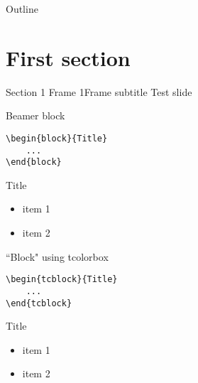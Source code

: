 {
    \addtocounter{framenumber}{-2}    %
    
    \begin{frame}
        \titlepage
    \end{frame}

    \begin{frame}{Outline}
        \tableofcontents[subsectionstyle=hide]
    \end{frame}
}


\section{First section}


\begin{frame}{Section 1 Frame 1}{Frame subtitle}
    Test slide
\end{frame}


\begin{frame}[fragile]{Beamer block}
	\begin{verbatim}
\begin{block}{Title}
    ...
\end{block}
    \end{verbatim}

    \begin{block}{Title}
        \begin{itemize}
            \item item 1
            \item item 2
        \end{itemize}
    \end{block}
\end{frame}


\begin{frame}[fragile]{``Block" using tcolorbox}
	\begin{verbatim}
\begin{tcblock}{Title}
    ...
\end{tcblock}
    \end{verbatim}

    \begin{tcblock}{Title}
        \begin{itemize}
            \item item 1
            \item item 2
        \end{itemize}
    \end{tcblock}
\end{frame}


